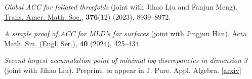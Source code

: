 \documentclass[margin,line,pifont,palatino,courier]{res}
\newenvironment{list1}{
  \begin{list}{\ding{113}}{%
      \setlength{\itemsep}{0in}
      \setlength{\parsep}{0in} \setlength{\parskip}{0in}
      \setlength{\topsep}{0in} \setlength{\partopsep}{0in}
      \setlength{\leftmargin}{0.17in}}}{\end{list}}
\begin{document}
\begin{resume}
\begin{list1}
\item \textit{Global ACC for foliated threefolds} (joint with Jihao Liu and Fanjun Meng). \href{https://www.ams.org/journals/tran/2023-376-12/S0002-9947-2023-09053-5/}{Trans. Amer. Math. Soc.}, \textbf{376}(12) (2023), 8939--8972.
\item \textit{A simple proof of ACC for MLD's for surfaces} (joint with Jingjun Han). \href{https://link.springer.com/article/10.1007/s10114-023-2094-x}{Acta Math. Sin. (Engl. Ser.)}, \textbf{40} (2024), 425--434.
\item \textit{Second largest accumulation point of minimal log discrepancies in dimension 3} (joint with Jihao Liu). Preprint, to appear in J. Pure. Appl. Algebra. [\href{https://arxiv.org/abs/2207.04610}{arxiv}]
\end{list1}


\end{resume}
\end{document}

